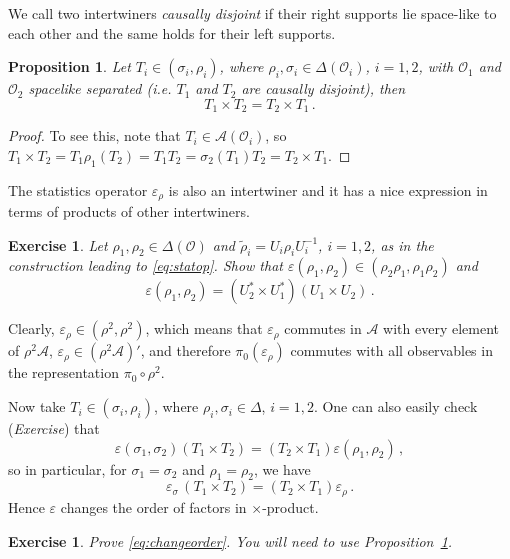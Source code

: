 \documentclass[12pt,a4paper]{article}
\newcommand{\1}{\mathds{1}}                         %
\newcommand{\Ocal}{\mathcal{O}}
\newcommand{\Ac}{{\mathcal{A}}}
\newcommand{\be}{\begin{equation}}
\newcommand{\ee}{\end{equation}}
\newtheorem{proposition}[theorem]{Proposition}
\newtheorem{exercise}[theorem]{Exercise}
\begin{document}
 We call two intertwiners \textit{causally disjoint} if their right supports lie space-like to each other and the same holds for their left supports. 
\begin{proposition}\label{prop:intcomm}
Let	 $T_i\in(\sigma_i,\rho_i)$, where $\rho_i,\sigma_i\in\Delta(\Ocal_i)$, $i=1,2$, with $\Ocal_1$ and $\Ocal_2$ spacelike separated (i.e. $T_1$ and $T_2$ are causally disjoint), then
\[
T_1\times T_2=T_2\times T_1\,.
\]
\end{proposition}
 \begin{proof}
 	To see this, note that $T_i\in\Ac(\Ocal_i)$, so $T_1\times T_2=T_1\rho_1(T_2)=T_1T_2=\sigma_2(T_1)T_2=T_2\times T_1$.
 \end{proof}
The statistics operator $\varepsilon_\rho$ is also an intertwiner and it has a nice expression in terms of products of other intertwiners.
\begin{exercise} Let $\rho_1,\rho_2\in\Delta(\Ocal)$ and $\tilde{\rho}_i=U_i\rho_i U_i^{-1}$, $i=1,2$, as in the construction leading to \eqref{eq:statop}. Show that $\varepsilon(\rho_1,\rho_2)\in(\rho_2\rho_1,\rho_1\rho_2)$ and 
	\[
	\varepsilon(\rho_1,\rho_2)=(U_2^*\times U_1^*)  (U_1\times U_2)\,.
	\]
\end{exercise}
Clearly, 
$\varepsilon_\rho\in(\rho^2,\rho^2)$, which means that $\varepsilon_\rho$ commutes in $\Ac$ with every element of $\rho^2\Ac$, $\varepsilon_\rho\in (\rho^2\Ac)'$, and therefore $\pi_0(\varepsilon_\rho)$ commutes with all observables in the representation $\pi_0\circ\rho^2$.

Now take $T_i\in (\sigma_i,\rho_i)$, where $\rho_i,\sigma_i\in\Delta$, $i=1,2$. One can also easily check (\textit{Exercise}) that
\be\label{eq:changeorder}
\varepsilon(\sigma_1,\sigma_2)  (T_1\times T_2)=(T_2\times T_1)  \varepsilon(\rho_1,\rho_2)\,,
\ee
so in particular, for $\sigma_1=\sigma_2$ and $\rho_1=\rho_2$, we have
\[
\varepsilon_\sigma \, (T_1\times T_2)=(T_2\times T_1)  \varepsilon_\rho\,.
\]
Hence $\varepsilon$ changes the order of factors in $\times$-product.
\begin{exercise}
	Prove \eqref{eq:changeorder}. You will need to use Proposition~\ref{prop:intcomm}.
\end{exercise}
\end{document}
